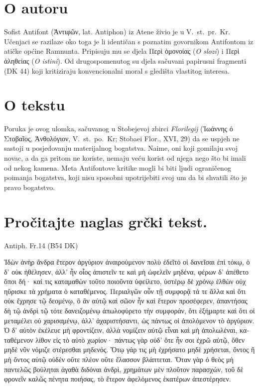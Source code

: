 \section*{O autoru}

Sofist Antifont \textgreek[variant=ancient]{(Ἀντιφῶν,} lat. Antiphon) iz Atene živio je u V.~st.\ pr.~Kr. Učenjaci se razilaze oko toga je li identičan s poznatim govornikom Antifontom iz atičke općine Ramnunta. Pripisuju mu se djela \textgreek[variant=ancient]{Περὶ ὁμονοίας} (\textit{O slozi}) i \textgreek[variant=ancient]{Περὶ ἀληθείας} (\textit{O istini}). Od drugospomenutog su djela sačuvani papirusni fragmenti (DK 44) koji kritiziraju konvencionalni moral s gledišta vlastitog interesa.

\section*{O tekstu}

Poruka je ovog ulomka, sačuvanog u Stobejevoj zbirci \textit{Florilegij} \textgreek[variant=ancient]{(Ἰωάννης ὁ Στοβαῖος,  Ἀνθολόγιον,} V.~st.\ po.~Kr; Stobaei Flor., XVI, 29) da se uspjeh ne sastoji u posjedovanju materijalnog bogatstva. Naime, oni koji gomilaju svoj novac, a da ga pritom ne koriste, nemaju veću korist od njega nego što bi imali od nekog kamena. Meta Antifontove kritike mogli bi biti ljudi ograničenog poimanja bogatstva, koji nisu sposobni upotrijebiti svoj um da bi shvatili što je pravo bogatstvo.


\section*{Pročitajte naglas grčki tekst.}

Antiph. Fr.14 (B54 DK)


\medskip

\begin{greek}
{\large
{ \noindent Ἰδὼν ἀνὴρ ἄνδρα ἕτερον ἀργύριον ἀναιρούμενον πολὺ ἐδεῖτό οἱ δανεῖσαι ἐπὶ τόκῳ, ὁ δ' οὐκ ἠθέλησεν, ἀλλ' ἦν οἷος ἀπιστεῖν τε καὶ μὴ ὠφελεῖν μηδένα, φέρων δ' ἀπέθετο ὅποι δή· καί τις καταμαθὼν τοῦτο ποιοῦντα ὑφείλετο, ὑστέρῳ δὲ χρόνῳ ἐλθὼν οὐχ ηὕρισκε τὰ χρήματα ὁ καταθέμενος. Περιαλγῶν οὖν τῇ συμφορᾷ τά τε ἄλλα καὶ ὅτι οὐκ ἔχρησε τῷ δεομένῳ, ὃ ἂν αὐτῷ καὶ σῶον ἦν καὶ ἕτερον προσέφερεν, ἀπαντήσας δὴ τῷ ἀνδρὶ τῷ τότε δανειζομένῳ ἀπωλοφύρετο τὴν συμφοράν, ὅτι ἐξήμαρτε καὶ ὅτι οἱ μεταμέλει οὐ χαρισαμένῳ, ἀλλ' ἀχαριστήσαντι, ὡς πάντως οἱ ἀπολόμενον τὸ ἀργύριον. Ὁ δ' αὐτὸν ἐκέλευε μὴ φροντίζειν, ἀλλὰ νομίζειν αὑτῷ εἶναι καὶ μὴ ἀπολωλέναι, καταθέμενον λίθον εἰς τὸ αὐτὸ χωρίον· πάντως γὰρ οὐδ' ὅτε ἦν σοι ἐχρῶ αὐτῷ, ὅθεν μηδὲ νῦν νόμιζε στέρεσθαι μηδενός. Ὅτῳ γάρ τις μὴ ἐχρήσατο μηδὲ χρήσεται, ὄντος ἢ μὴ ὄντος αὐτῷ οὐδὲν οὔτε πλέον οὔτε ἔλασσον βλάπτεται. Ὅταν γὰρ ὁ θεὸς μὴ παντελῶς βούληται ἀγαθὰ διδόναι ἀνδρὶ, χρημάτων μὲν πλοῦτον παρασχών, τοῦ δὲ φρονεῖν καλῶς πένητα ποιήσας, τὸ ἕτερον ἀφελόμενος ἑκατέρων ἀπεστέρησεν.

}
}
\end{greek}

